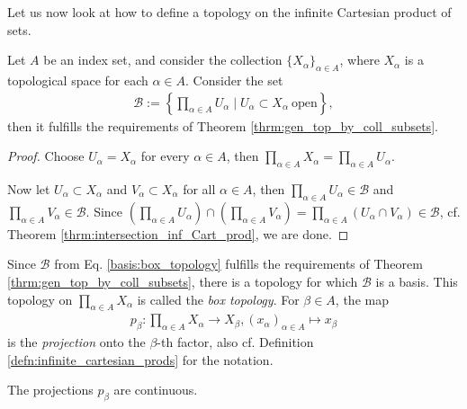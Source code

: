 Let us now look at how to define a topology on the infinite Cartesian product of sets.

\begin{theorem}
	Let $A$ be an index set, and consider the collection $\{X_{\alpha}\}_{\alpha\in A}$, where $X_{\alpha}$ is a topological space for each $\alpha\in A$. Consider the set
	\begin{align}\label{basis:box_topology}
		\mathscr B := \left\{ \prod_{\alpha\in A}U_{\alpha}\mid U_{\alpha}\subset X_{\alpha}\ \text{open} \right\},
	\end{align}
	then it fulfills the requirements of Theorem \ref{thrm:gen_top_by_coll_subsets}.
\end{theorem}

\begin{proof}
	Choose $U_{\alpha} = X_{\alpha}$ for every $\alpha\in A$, then $\prod_{\alpha\in A}X_{\alpha} = \prod_{\alpha\in A}U_{\alpha}$.
	
	Now let $U_{\alpha}\subset X_{\alpha}$ and $V_{\alpha}\subset X_{\alpha}$ for all $\alpha\in A$, then $\prod_{\alpha\in A}U_{\alpha}\in \mathscr B$ and $\prod_{\alpha\in A}V_{\alpha}\in \mathscr B$. Since $\left(\prod_{\alpha\in A}U_{\alpha}\right) \cap \left(\prod_{\alpha\in A}V_{\alpha}\right) = \prod_{\alpha\in A}\left(U_{\alpha}\cap V_{\alpha}\right)\in\mathscr B$, cf. Theorem \ref{thrm:intersection_inf_Cart_prod}, we are done.
\end{proof}

\begin{defn}
	Since $\mathscr B$ from Eq. \eqref{basis:box_topology} fulfills the requirements of Theorem \ref{thrm:gen_top_by_coll_subsets}, there is a topology for which $\mathscr B$ is a basis. This topology on $\prod_{\alpha\in A}X_{\alpha}$ is called the \textit{box topology}. For $\beta\in A$, the map 
	\begin{align}\label{eq:projection_box_topology}
		p_{\beta}: \prod_{\alpha\in A}X_{\alpha}\to X_{\beta}, (x_\alpha)_{\alpha\in A}\mapsto x_{\beta}
	\end{align} is the \textit{projection} onto the $\beta$-th factor, also cf. Definition \ref{defn:infinite_cartesian_prods} for the notation.
\end{defn}

\begin{remark}\label{remark:projections_inf_Cart_prod_continuous}
	The projections $p_{\beta}$ are continuous.
\end{remark}

